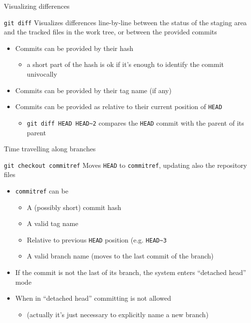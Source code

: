 \documentclass[presentation]{beamer}
\begin{document}
\begin{frame}{Visualizing differences}
    \begin{block}{\texttt{git diff}}
        Visualizes differences line-by-line between the status of the staging area and the tracked files in the work tree, or between the provided commits
        \begin{itemize}
            \item Commits can be provided by their hash
            \begin{itemize}
                \item a short part of the hash is ok if it's enough to identify the commit univocally
            \end{itemize}
            \item Commits can be provided by their tag name (if any)
            \item Commits can be provided as relative to their current position of \texttt{HEAD}
            \begin{itemize}
                \item \texttt{git diff HEAD HEAD\textasciitilde{}2} compares the \texttt{HEAD} commit with the parent of its parent
            \end{itemize}
        \end{itemize}
    \end{block}
\end{frame}

\begin{frame}{Time travelling along branches}
    \begin{block}{\texttt{git checkout commitref}}
        Moves \texttt{HEAD} to \texttt{commitref}, updating also the repository files
        \begin{itemize}
            \item \texttt{commitref} can be
            \begin{itemize}
                \item A (possibly short) commit hash
                \item A valid tag name
                \item Relative to previous \texttt{HEAD} position (e.g. \texttt{HEAD\textasciitilde{}3}
                \item A valid branch name (moves to the last commit of the branch)
            \end{itemize}
            \item If the commit is not the last of its branch, the system enters ``detached head'' mode
            \item When in ``detached head'' committing is not allowed
            \begin{itemize}
                \item (actually it's just necessary to explicitly name a new branch)
            \end{itemize}
        \end{itemize}
    \end{block}
\end{frame}
\end{document}
